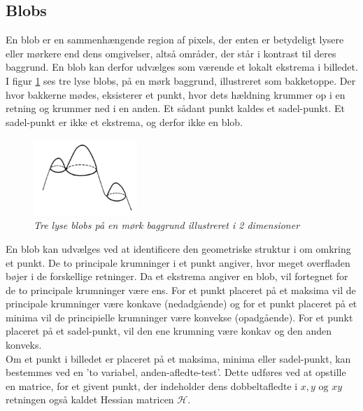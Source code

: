 \subsection*{Blobs}\label{sec:blobs}
En blob er en sammenhængende region af pixels, der enten er betydeligt lysere eller mørkere end dens omgivelser, altså områder, der står i kontrast til deres baggrund. En blob kan derfor udvælges som værende et lokalt ekstrema i billedet.
I figur \ref{fig:lindblob1} ses tre lyse blobs, på en mørk baggrund, illustreret som bakketoppe. Der hvor bakkerne mødes, eksisterer et punkt, hvor dets hældning krummer op i en retning og krummer ned i en anden. Et sådant punkt kaldes et sadel-punkt. Et sadel-punkt er ikke et ekstrema, og derfor ikke en blob.
\begin{figure}[H]
    \centering
    \includegraphics[width=0.35\textwidth]{fig/44.png}
    \vspace{-0.5em}   
    \begin{center}
    \caption{{\footnotesize \textit{
    Tre lyse blobs på en mørk baggrund illustreret i 2 dimensioner \cite{blob}}}}
    \label{fig:lindblob1}
     \end{center}
  \end{figure}
       \vspace{-2.7em}
\noindent
En blob kan udvælges ved at identificere den geometriske struktur i om omkring et punkt. De to principale krumninger i et punkt angiver, hvor meget overfladen bøjer i de forskellige retninger. Da et ekstrema angiver en blob, vil fortegnet for de to principale krumninger være ens. For et punkt placeret på et maksima vil de principale krumninger være konkave (nedadgående) og for et punkt placeret på et minima vil de principielle krumninger være konvekse (opadgående). For et punkt placeret på et sadel-punkt, vil den ene krumning være konkav og den anden konveks. \\ 
Om et punkt i billedet er placeret på et maksima, minima eller sadel-punkt, kan bestemmes ved en 'to variabel, anden-afledte-test'. Dette udføres ved at opstille en matrice, for et givent punkt, der indeholder dens dobbeltafledte i $x, y \text{ og } xy$ retningen også kaldet Hessian matricen $\mathcal{H}$.
